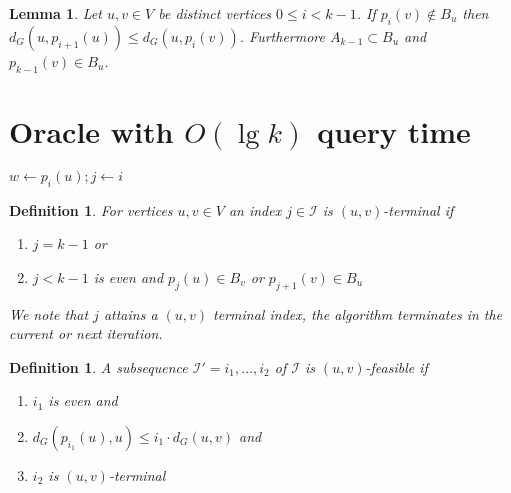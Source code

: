 \documentclass[12pt]{article}
\newtheorem{lem}[thm]{Lemma}
\newtheorem{defi}[thm]{Definition}
\begin{document}
\begin{lem}
Let $u,v \in V$ be distinct vertices $0 \leq i < k-1$. If $p_i(v) \not\in B_{u}$ then $d_G(u, p_{i+1}(u)) \leq d_G(u, p_i(v))$. Furthermore $A_{k-1} \subset B_u$ and $p_{k-1}(v) \in B_u$. \label{lem:onedeltaperiteration}
\end{lem}

\section{Oracle with $O(\lg k)$ query time}
\begin{Walgo}[ht]{20pt}
  \DontPrintSemicolon
  \Indm
    \Indp
    \BlankLine
    $w \leftarrow p_i(u); j \leftarrow i$
    
    
    \caption{$dist_k(u,v,i)$}
    \label{alg:0.1}
\end{Walgo}

\begin{defi}
For vertices $u,v \in V$ an index $j \in \mathcal{I}$ is $(u,v)$-terminal if
\begin{enumerate}
\item $j = k-1$ or
\item $j < k-1$ is even and $p_j(u) \in B_v$ or $p_{j+1}(v) \in B_u$ 
\end{enumerate}
We note that $j$ attains a $(u,v)$ terminal index, the algorithm terminates in the current or next iteration.
\end{defi}

\begin{defi}
A subsequence $\mathcal{I'}=i_1, \hdots, i_2$ of $\mathcal{I}$ is $(u,v)$-feasible if
\begin{enumerate}
\item $i_1$ is even and
\item $d_{G}(p_{i_1}(u),u) \leq i_1 \cdot d_G(u,v)$ and
\item $i_2$ is $(u,v)$-terminal
\end{enumerate}
\end{defi}
\end{document}

